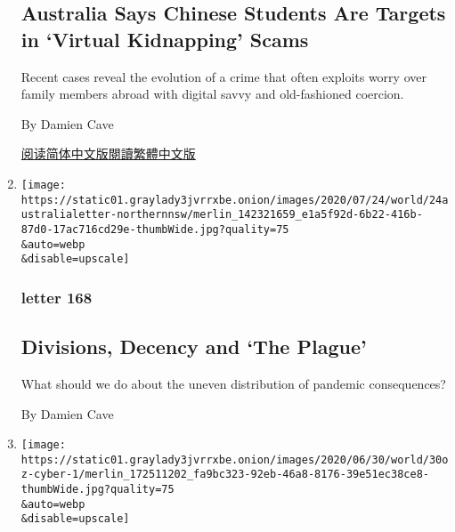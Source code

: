 \begin{enumerate}
  \hypertarget{australia-says-chinese-students-are-targets-in-virtual-kidnapping-scams}{%
  \subsection{Australia Says Chinese Students Are Targets in `Virtual
  Kidnapping'
  Scams}\label{australia-says-chinese-students-are-targets-in-virtual-kidnapping-scams}}

  Recent cases reveal the evolution of a crime that often exploits worry
  over family members abroad with digital savvy and old-fashioned
  coercion.

  By Damien Cave

  \href{https://cn.nytimes3xbfgragh.onion/asia-pacific/20200729/chinese-students-virtual-kidnapping/}{阅读简体中文版}\href{https://cn.nytimes3xbfgragh.onion/asia-pacific/20200729/chinese-students-virtual-kidnapping/zh-hant/}{閱讀繁體中文版}
\item
  \href{/2020/07/24/world/australia/divisions-decency-and-the-plague.html}{}

  \texttt{[image: https://static01.graylady3jvrrxbe.onion/images/2020/07/24/world/24australialetter-northernnsw/merlin\_142321659\_e1a5f92d-6b22-416b-87d0-17ac716cd29e-thumbWide.jpg?quality=75\\\&auto=webp\\\&disable=upscale]}

  \hypertarget{letter-168}{%
  \subsubsection{letter 168}\label{letter-168}}

  \hypertarget{divisions-decency-and-the-plague}{%
  \subsection{Divisions, Decency and `The
  Plague'}\label{divisions-decency-and-the-plague}}

  What should we do about the uneven distribution of pandemic
  consequences?

  By Damien Cave
\item
  \href{/2020/06/30/world/australia/cyber-defense-china-hacking.html}{}

  \texttt{[image: https://static01.graylady3jvrrxbe.onion/images/2020/06/30/world/30oz-cyber-1/merlin\_172511202\_fa9bc323-92eb-46a8-8176-39e51ec38ce8-thumbWide.jpg?quality=75\\\&auto=webp\\\&disable=upscale]}

  \hypertarget{australia-spending-nearly-1-billion-on-cyberdefense-as-china-tensions-rise}{%
}
\end{enumerate}
